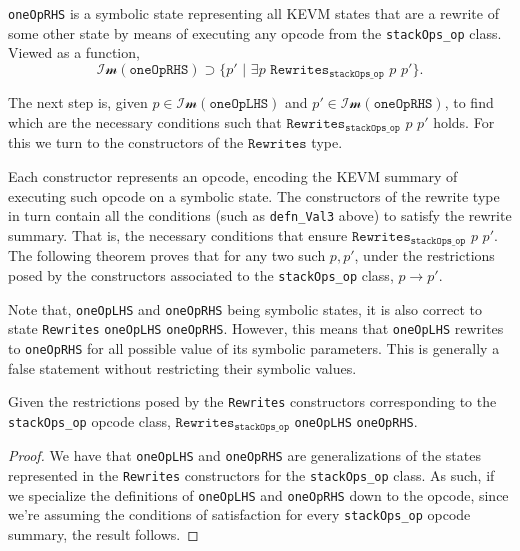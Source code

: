 \begin{definition}[oneOpRHS]\label{def:oneOpRHS}
\leanok{}

\texttt{oneOpRHS} is a symbolic state representing all KEVM states that are a
rewrite of some other state by means of executing any opcode from the
\texttt{stackOps_op} class. Viewed as a
function, $$\mathcal{Im}(\texttt{oneOpRHS}) \supset \{p'\,\, |\,\, \exists
p\,\,\texttt{Rewrites}_{\texttt{stackOps_op}}\,\, p \,\, p'\}.$$

\end{definition}

The next step is, given $p\in\mathcal{Im}(\texttt{oneOpLHS})$ and
$p'\in\mathcal{Im}(\texttt{oneOpRHS})$, to find which are the necessary
conditions such that $\texttt{Rewrites}_{\texttt{stackOps_op}}\,\, p \,\, p'$
holds. For this we turn to the constructors of the $\texttt{Rewrites}$ type.

Each constructor represents an opcode, encoding the KEVM summary of executing such
opcode on a symbolic state. The constructors of the rewrite type in turn contain
all the conditions (such as \texttt{defn_Val3} above) to satisfy the rewrite
summary. That is, the necessary conditions that ensure
$\texttt{Rewrites}_{\texttt{stackOps_op}}\,\, p \,\, p'$. The following theorem
proves that for any two such $p, p'$, under the restrictions posed by the
constructors associated to the \texttt{stackOps_op} class, $p\rightarrow p'$.

Note that, \texttt{oneOpLHS} and \texttt{oneOpRHS} being symbolic states, it is
also correct to state \texttt{Rewrites} \texttt{oneOpLHS} \texttt{oneOpRHS}.
However, this means that \texttt{oneOpLHS} rewrites to \texttt{oneOpRHS} for all
possible value of its symbolic parameters. This is generally a false statement
without restricting their symbolic values.

\begin{theorem}\label{thm:oneOpRw}
\leanok
{}

Given the restrictions posed by the \texttt{Rewrites} constructors corresponding
to the \texttt{stackOps_op} opcode class,
$\texttt{Rewrites}_{\texttt{stackOps_op}}$ \texttt{oneOpLHS} \texttt{oneOpRHS}.

\end{theorem}

\begin{proof}
\leanok

We have that \texttt{oneOpLHS} and \texttt{oneOpRHS} are generalizations of the
states represented in the \texttt{Rewrites} constructors for the
\texttt{stackOps_op} class. As such, if we specialize the definitions of
\texttt{oneOpLHS} and \texttt{oneOpRHS} down to the opcode, since we're assuming
the conditions of satisfaction for every \texttt{stackOps_op} opcode summary,
the result follows.

\end{proof}

